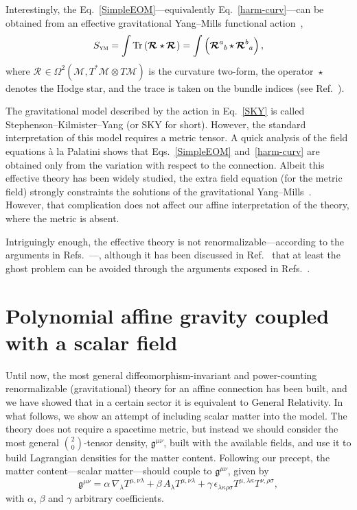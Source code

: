 \documentclass[aps,prd,12pt,twocolumn,superscriptaddress,showpacs,showkeys,reprint%
]{revtex4-1}
\DeclareMathOperator{\st}{\star}
\newcommand{\Mi}{\mathcal{M}}
\newcommand{\Rif}[2]{\boldsymbol{\mathcal{R}}^{{#1}}{}_{{#2}}}
\newcommand{\Tr}{\operatorname{Tr}}
\renewcommand{\(}{\left(}
\renewcommand{\)}{\right)}
\renewcommand{\[}{\left[}
\renewcommand{\]}{\right]}
\begin{document}
Interestingly, the Eq.~\eqref{SimpleEOM}---equivalently Eq.~\eqref{harm-curv}---can be obtained from an effective gravitational Yang--Mills functional action~\cite{stephenson1958quadratic,kilmister1961use,Yang1974}, %
\begin{equation}
  \label{SKY}
  S_{\textsc{ym}} = \int \Tr \left( \Rif{}{} \st \Rif{}{} \right) = \int \left( \Rif{a}{b} \st \Rif{b}{a} \right),
\end{equation}
where $\Rif{}{} \in \Omega^2(\Mi, T^*\Mi \otimes T\Mi)$ is the curvature two-form, the operator $\st$ denotes the Hodge star, and the trace is taken on the bundle indices (see Ref.~\cite{bourguignon1982yang}).

The gravitational model described by the action in Eq.~\eqref{SKY} is called Stephenson--Kilmister--Yang (or SKY for short). However, the standard interpretation of this model requires a metric tensor. A quick analysis of the field equations \`a la Palatini shows that Eqs.~\eqref{SimpleEOM} and~\eqref{harm-curv} are obtained only from the variation with respect to the connection. Albeit this effective theory has been widely studied, the extra field equation (for the metric field) strongly constraints the solutions of the gravitational Yang--Mills~\cite{JZcomm}. However, that complication does not affect our affine interpretation of the theory, where the metric is absent.

Intriguingly enough, the effective theory is not renormalizable---according to the arguments in Refs.~\cite{McGady:2013sga,Camanho:2014apa}---, although it has been discussed in Ref.~\cite{Chen:2010at} that at least the ghost problem can be avoided through the arguments exposed in Refs.~\cite{Kleinert:1987eb,Bender:2007wu,Bender:2008vh,Mannheim:2009zj}.


\section{\label{matter}Polynomial affine gravity coupled with a scalar field}

Until now, the most general diffeomorphism-invariant and power-counting renormalizable (gravitational) theory for an affine connection has been built, and we have showed that in a certain sector it is equivalent to General Relativity. In what follows, we show an attempt of including scalar matter into the model. The theory does not require a spacetime metric, but instead we should consider the most general $\binom{2}{0}$-tensor density, $\mathfrak{g}^{\mu\nu}$,  built with the available fields, and use it to build Lagrangian densities for the matter content. Following our precept, the matter content---scalar matter---should couple to $\mathfrak{g}^{\mu\nu}$, given by
\begin{dmath}
  \mathfrak{g}^{\mu\nu} = \alpha \, \nabla_\lambda T^{\mu,\nu\lambda} + \beta \, A_\lambda T^{\mu,\nu\lambda} + \gamma \, \epsilon_{\lambda\kappa\rho\sigma} T^{\mu, \lambda\kappa} T^{\nu, \rho\sigma},
  \label{geng}
\end{dmath}
with $\alpha$, $\beta$ and $\gamma$ arbitrary coefficients.
\end{document}
